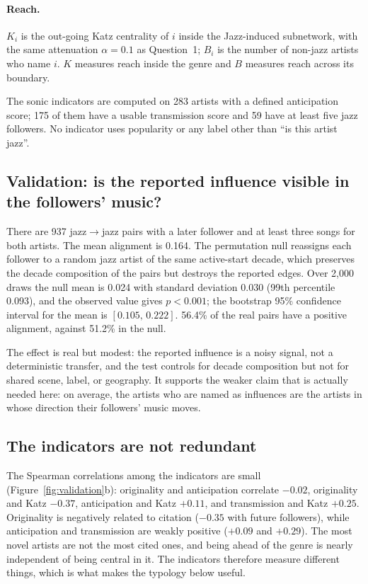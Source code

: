 \documentclass[11pt]{article}
\begin{document}
\paragraph{Reach.}
$K_i$ is the out-going Katz centrality of $i$ inside the Jazz-induced subnetwork, with the same
attenuation $\alpha=0.1$ as Question~1; $B_i$ is the number of non-jazz artists who name $i$.
$K$ measures reach inside the genre and $B$ measures reach across its boundary.

The sonic indicators are computed on 283 artists with a defined anticipation score;
175 of them have a usable transmission score and 59 have at least five jazz
followers.
No indicator uses popularity or any label other than ``is this artist jazz''.

\subsection{Validation: is the reported influence visible in the followers' music?}
There are 937 jazz$\to$jazz pairs with a later follower and at least three songs for both
artists.
The mean alignment is 0.164.
The permutation null reassigns each follower to a random jazz artist of the same active-start
decade, which preserves the decade composition of the pairs but destroys the reported edges.
Over 2,000 draws the null mean is 0.024 with standard deviation 0.030 (99th
percentile 0.093), and the observed value gives $p<0.001$; the bootstrap 95\%
confidence interval for the mean is $[0.105,\,0.222]$.
56.4\% of the real pairs have a positive alignment, against 51.2\% in the null.

The effect is real but modest: the reported influence is a noisy signal, not a deterministic
transfer, and the test controls for decade composition but not for shared scene, label, or
geography.
It supports the weaker claim that is actually needed here: on average, the artists who are named as
influences are the artists in whose direction their followers' music moves.

\subsection{The indicators are not redundant}
The Spearman correlations among the indicators are small (Figure~\ref{fig:validation}b):
originality and anticipation correlate $-0.02$, originality and Katz $-0.37$,
anticipation and Katz $+0.11$, and transmission and Katz $+0.25$.
Originality is negatively related to citation ($-0.35$ with future followers), while
anticipation and transmission are weakly positive ($+0.09$ and $+0.29$).
The most novel artists are not the most cited ones, and being ahead of the genre is nearly
independent of being central in it.
The indicators therefore measure different things, which is what makes the typology below useful.
\end{document}
